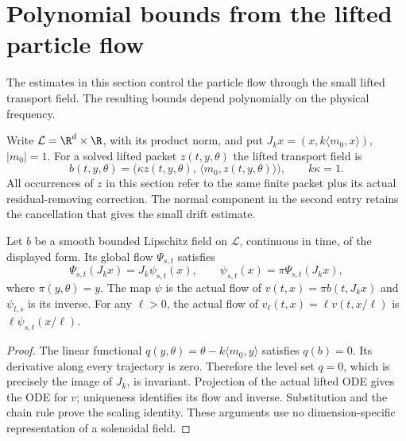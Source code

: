 \section{Polynomial bounds from the lifted particle flow}
The estimates in this section control the particle flow through the
small lifted transport field. The resulting bounds depend polynomially
on the physical frequency.

Write $\mathcal L=\R^d\times\R$, with its product norm, and put
$J_kx=(x,k\langle m_0,x\rangle)$, $|m_0|=1$. For a solved lifted packet
$z(t,y,\theta)$ the lifted transport field is
\[
 b(t,y,\theta)=\bigl(\kappa z(t,y,\theta),\,
                         \langle m_0,z(t,y,\theta)\rangle\bigr),
 \qquad k\kappa=1.
\]
All occurrences of $z$ in this section refer to the same finite packet
plus its actual residual-removing correction. The normal component in
the second entry retains the cancellation that gives the small drift estimate.

\begin{lemma}\label{lem:graph-invariant}
Let $b$ be a smooth bounded Lipschitz field on $\mathcal L$, continuous
in time, of the displayed form. Its global flow $\Psi_{s,t}$ satisfies
\[
 \Psi_{s,t}(J_kx)=J_k\psi_{s,t}(x),\qquad
 \psi_{s,t}(x)=\pi\Psi_{s,t}(J_kx),
\]
where $\pi(y,\theta)=y$. The map $\psi$ is the actual flow of
$v(t,x)=\pi b(t,J_kx)$ and $\psi_{t,s}$ is its inverse.
For any $\ell>0$, the actual flow of
$v_\ell(t,x)=\ell v(t,x/\ell)$ is
$\ell\psi_{s,t}(x/\ell)$.
\end{lemma}
\begin{proof}
The linear functional $q(y,\theta)=\theta-k\langle m_0,y\rangle$
satisfies $q(b)=0$. Its derivative along every trajectory is zero.
Therefore the level set $q=0$, which is precisely the image of $J_k$,
is invariant. Projection of the actual lifted ODE gives the ODE for
$v$; uniqueness identifies its flow and inverse. Substitution and the
chain rule prove the scaling identity. These arguments use no
dimension-specific representation of a solenoidal field.
\end{proof}

